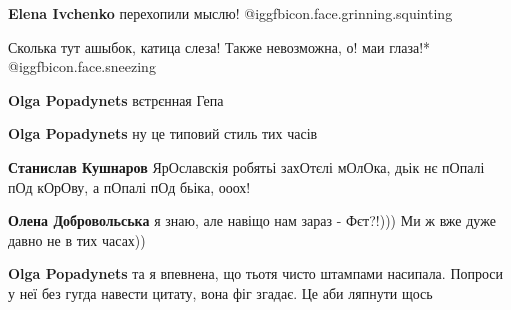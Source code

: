 \begin{itemize}
{\begin{itemize}
{\textbf{Elena Ivchenko} перехопили мыслю! @igg{fbicon.face.grinning.squinting} 

 
Сколька тут ашыбок, катица слеза!
Также невозможна,
о! маи глаза!* @igg{fbicon.face.sneezing} 

 
\textbf{Olga Popadynets} вєтрєнная Гепа

 
\textbf{Olga Popadynets} ну це типовий стиль тих часів

 
\textbf{Станислав Кушнаров} ЯрОславскія робятьі захОтєлі мОлОка, дьік нє пОпалі пОд кОрОву, а пОпалі пОд бьіка, ооох!

 
\textbf{Олена Добровольська} я знаю, але навіщо нам зараз - Фєт?!))) Ми ж вже дуже давно не в тих часах))

 
\textbf{Olga Popadynets} та я впевнена, що тьотя чисто штампами насипала.
Попроси у неї без гугда навести цитату, вона фіг згадає. Це аби ляпнути щось

}
\end{itemize}}
\end{itemize}
